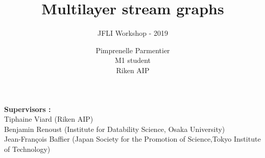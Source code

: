 \documentclass[15pt]{beamer}
\title{Multilayer stream graphs} %
\subtitle{JFLI Workshop - 2019}
\author{Pimprenelle Parmentier \\ M1 student\\ Riken AIP} %
\institute{\textit{pimprenelle.parmentier@polytechnique.edu}}
\date{}
\begin{document}
\begin{frame}
\titlepage %
\centering
\textbf{Supervisors :} \\
Tiphaine Viard {\footnotesize(Riken AIP)}\\
Benjamin Renoust {\scriptsize(Institute for Datability Science}, {\footnotesize Osaka University)}\\
Jean-François Baffier {\scriptsize(Japan Society for the Promotion of Science},{\footnotesize Tokyo Institute of Technology)}
\end{frame}


\end{document}
